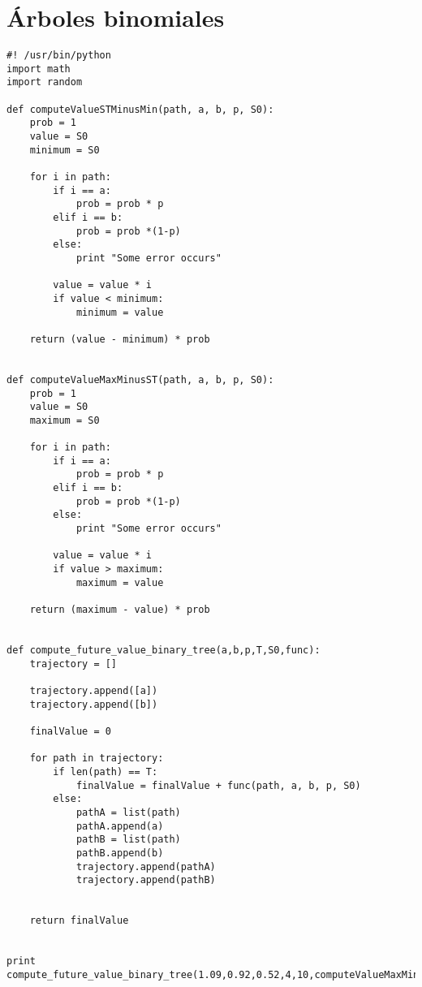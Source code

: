 \documentclass{apuntes}
\begin{document}
\section{Árboles binomiales}\label{sec:arbolBin}





\begin{lstlisting}
#! /usr/bin/python
import math
import random

def computeValueSTMinusMin(path, a, b, p, S0):
	prob = 1
	value = S0
	minimum = S0

	for i in path:
		if i == a:
			prob = prob * p
		elif i == b:
			prob = prob *(1-p)
		else:
			print "Some error occurs"

		value = value * i
		if value < minimum:
			minimum = value

	return (value - minimum) * prob


def computeValueMaxMinusST(path, a, b, p, S0):
	prob = 1
	value = S0
	maximum = S0

	for i in path:
		if i == a:
			prob = prob * p
		elif i == b:
			prob = prob *(1-p)
		else:
			print "Some error occurs"

		value = value * i
		if value > maximum:
			maximum = value

	return (maximum - value) * prob


def compute_future_value_binary_tree(a,b,p,T,S0,func):
	trajectory = []

	trajectory.append([a])
	trajectory.append([b])

	finalValue = 0

	for path in trajectory:
		if len(path) == T:
			finalValue = finalValue + func(path, a, b, p, S0)
		else:
			pathA = list(path)
			pathA.append(a)
			pathB = list(path)
			pathB.append(b)
			trajectory.append(pathA)
			trajectory.append(pathB)


	return finalValue


print compute_future_value_binary_tree(1.09,0.92,0.52,4,10,computeValueMaxMinusST)
\end{lstlisting}

\printindex
\end{document}
